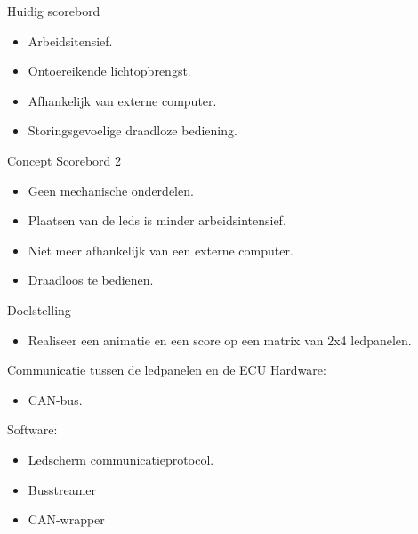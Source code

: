 \begin{frame}
	\titlepage
\end{frame}

\begin{frame}{Huidig scorebord}
	\begin{itemize}
		\item Arbeidsitensief.
		\item Ontoereikende lichtopbrengst.
		\item Afhankelijk van externe computer.
		\item Storingsgevoelige draadloze bediening.
	\end{itemize}
\end{frame}

\begin{frame}{Concept Scorebord 2}
	\begin{itemize}
		\item Geen mechanische onderdelen.
		\item Plaatsen van de leds is minder arbeidsintensief.
		\item Niet meer afhankelijk van een externe computer.
		\item Draadloos te bedienen.
	\end{itemize}
\end{frame}

\begin{frame}{Doelstelling}
	\begin{itemize}
		\item Realiseer een animatie en een score op een matrix van 2x4 ledpanelen.
	\end{itemize}
\end{frame}

\begin{frame}{Communicatie tussen de ledpanelen en de ECU}
	Hardware:
	\begin{itemize}
		\item CAN-bus.
	\end{itemize}
	
	Software:
	\begin{itemize}
		\item Ledscherm communicatieprotocol.
		\item Busstreamer
		\item CAN-wrapper
	\end{itemize}
\end{frame}

